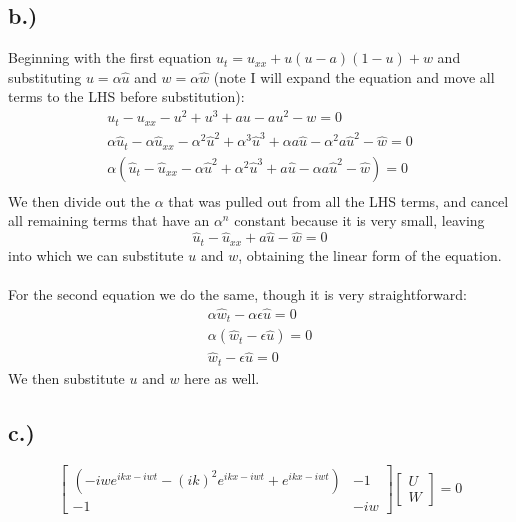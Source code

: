 \documentclass{article}
\begin{document}
\subsection*{b.)}
Beginning with the first equation $u_t = u_{xx} + u(u - a)(1-u) + w$ and substituting $u = \alpha\hat{u}$ and $w = \alpha\hat{w}$ (note I will expand the equation and move all terms to the LHS before substitution):
\begin{equation}
\begin{aligned}
u_t - u_{xx} - u^2 + u^3 + au - au^2 - w = 0\\
\alpha\hat{u}_t - \alpha\hat{u}_{xx} - \alpha^2\hat{u}^2 + \alpha^3\hat{u}^3 + \alpha a\hat{u} - \alpha^2 a\hat{u}^2 - \hat{w} = 0\\
\alpha (\hat{u}_t - \hat{u}_{xx} - \alpha\hat{u}^2 + \alpha^2\hat{u}^3 +  a\hat{u} - \alpha a\hat{u}^2 - \hat{w}) = 0\\
\end{aligned}
\end{equation}
We then divide out the $\alpha$ that was pulled out from all the LHS terms, and cancel all remaining terms that have an $\alpha^n$ constant because it is very small, leaving
\begin{equation}
\hat{u}_t - \hat{u}_{xx} + a\hat{u} - \hat{w} = 0
\end{equation}
into which we can substitute $u$ and $w$, obtaining the linear form of the equation.\\
\\
For the second equation we do the same, though it is very straightforward:
\begin{equation}
\begin{aligned}
\alpha\hat{w}_t - \alpha\epsilon\hat{u} = 0\\
\alpha(\hat{w}_t - \epsilon\hat{u}) = 0\\
\hat{w}_t - \epsilon\hat{u} = 0
\end{aligned}
\end{equation}
We then substitute $u$ and $w$ here as well.
\subsection*{c.)}
\[
\begin{bmatrix}
(-iwe^{ikx - iwt} - (ik)^2e^{ikx - iwt} + e^{ikx - iwt}) & -1\\
-1 & -iw
\end{bmatrix}
\begin{bmatrix}
U\\
W
\end{bmatrix}
= 0
\]
\end{document}
